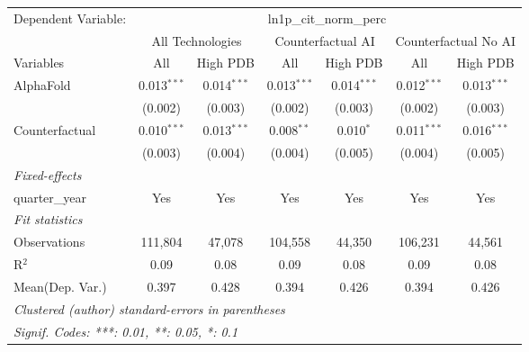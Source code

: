 \begingroup
\centering
\begin{tabular}{lcccccc}
   \tabularnewline \midrule \midrule
   Dependent Variable: & \multicolumn{6}{c}{ln1p\_cit\_norm\_perc}\\
 & \multicolumn{2}{c}{All Technologies} & \multicolumn{2}{c}{Counterfactual AI} & \multicolumn{2}{c}{Counterfactual No AI} \\
\cmidrule(lr){1-1}\cmidrule(lr){2-3} \cmidrule(lr){4-5} \cmidrule(lr){6-7}
Variables & \multicolumn{1}{c}{All} & \multicolumn{1}{c}{High PDB} & \multicolumn{1}{c}{All} & \multicolumn{1}{c}{High PDB} & \multicolumn{1}{c}{All} & \multicolumn{1}{c}{High PDB} \\
\cmidrule(lr){1-1}\cmidrule(lr){2-2} \cmidrule(lr){3-3} \cmidrule(lr){4-4} \cmidrule(lr){5-5} \cmidrule(lr){6-6} \cmidrule(lr){7-7}
   AlphaFold      & 0.013$^{***}$ & 0.014$^{***}$ & 0.013$^{***}$ & 0.014$^{***}$ & 0.012$^{***}$ & 0.013$^{***}$\\   
                  & (0.002)       & (0.003)       & (0.002)       & (0.003)       & (0.002)       & (0.003)\\   
   Counterfactual & 0.010$^{***}$ & 0.013$^{***}$ & 0.008$^{**}$  & 0.010$^{*}$   & 0.011$^{***}$ & 0.016$^{***}$\\   
                  & (0.003)       & (0.004)       & (0.004)       & (0.005)       & (0.004)       & (0.005)\\   
   \midrule
   \emph{Fixed-effects}\\
   quarter\_year  & Yes           & Yes           & Yes           & Yes           & Yes           & Yes\\  
   \midrule
   \emph{Fit statistics}\\
   Observations   & 111,804       & 47,078        & 104,558       & 44,350        & 106,231       & 44,561\\  
   R$^2$          & 0.09          & 0.08          & 0.09          & 0.08          & 0.09          & 0.08\\  
Mean(Dep. Var.) & 0.397 & 0.428 & 0.394 & 0.426 & 0.394 & 0.426 \\
   \midrule \midrule
   \multicolumn{7}{l}{\emph{Clustered (author) standard-errors in parentheses}}\\
   \multicolumn{7}{l}{\emph{Signif. Codes: ***: 0.01, **: 0.05, *: 0.1}}\\
\end{tabular}
\par\endgroup
